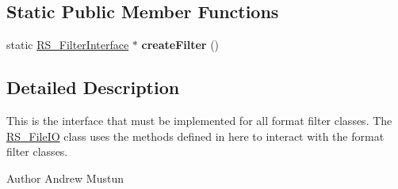 \subsection*{Static Public Member Functions}
\begin{DoxyCompactItemize}
\item 
\hypertarget{classRS__FilterInterface_a27ce5aed62fd14a88102041523c7210e}{static \hyperlink{classRS__FilterInterface}{R\-S\-\_\-\-Filter\-Interface} $\ast$ {\bfseries create\-Filter} ()}\label{classRS__FilterInterface_a27ce5aed62fd14a88102041523c7210e}

\end{DoxyCompactItemize}


\subsection{Detailed Description}
This is the interface that must be implemented for all format filter classes. The \hyperlink{classRS__FileIO}{R\-S\-\_\-\-File\-I\-O} class uses the methods defined in here to interact with the format filter classes.

\begin{DoxyAuthor}{Author}
Andrew Mustun 
\end{DoxyAuthor}


